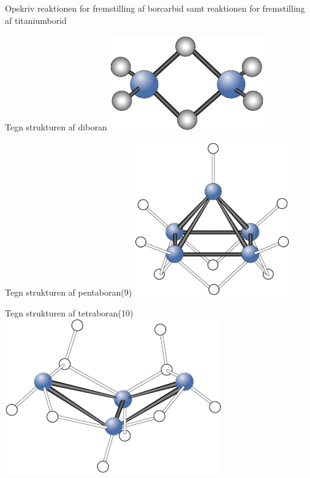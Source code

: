 \begin{flashcard}[Fremstilling]{Opskriv reaktionen for fremstilling af borcarbid samt reaktionen for fremstilling af titaniumborid}
\\ \vspace{7pt}
\end{flashcard}

\begin{flashcard}[Struktur]{Tegn strukturen af diboran}
\includegraphics[width=0.5\textwidth]{figures/k13s295Diboran.png}
\end{flashcard}

\begin{flashcard}[Struktur]{Tegn strukturen af pentaboran(9)}
\includegraphics[width=0.5\textwidth]{figures/k13s296Pentaboran.png}
\end{flashcard}

\begin{flashcard}[Struktur]{Tegn strukturen af tetraboran(10)}
\includegraphics[width=0.7\textwidth]{figures/k13s296Tetraboran.png}
\end{flashcard}

